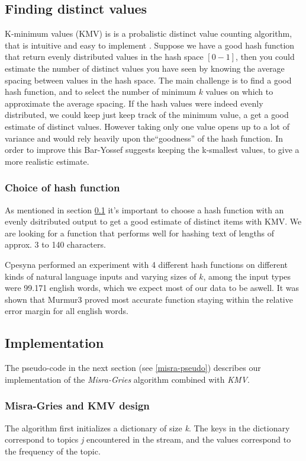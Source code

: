 

\subsection{Finding distinct values}\label{algo-distinct}
K-minimum values (KMV) is is a probalistic distinct value counting algorithm, that is intuitive and easy to implement \cite{kmv}. Suppose we have a good hash function that return evenly distributed values in the hash space $[0-1]$, then you could estimate the number of distinct values you have seen by knowing the average spacing between values in the hash space. The main challenge is to find a good hash function, and to select the number of minimum $k$ values on which to approximate the average spacing. If the hash values were indeed evenly distributed, we could keep just keep track of the minimum value, a get a good estimate of distinct values. However taking only one value opens up to a lot of variance and would rely heavily upon the``goodness'' of the hash function. In order to improve this Bar-Yossef\cite{Bar-Yossef} suggests keeping the k-smallest values, to give a more realistic estimate.

\subsubsection{Choice of hash function}\label{hash-function}
As mentioned in section \ref{algo-distinct} it's important to choose a hash function with an evenly dsitributed output to get a good estimate of distinct items with KMV. We are looking for a function that performs well for hashing text of lengths of approx. 3 to 140 characters. 

Cpesyna \cite{KMV1} performed an experiment with 4 different hash functions on different kinds of natural language inputs and varying sizes of $k$, among the input types were 99.171 english words, which we expect most of our data to be aswell. It was shown that Murmur3 proved most accurate function staying within the relative error margin for all english words.

\subsection{Implementation}\label{algo-data}
The pseudo-code in the next section (see \ref{misra-pseudo}) describes our implementation of the \textit{Misra-Gries} algorithm combined with \textit{KMV}.  

\subsubsection{Misra-Gries and KMV design}\label{misra-gries}
The algorithm first initializes a dictionary of size \textit{k}. The keys in the dictionary correspond to topics \textit{j} encountered in the stream, and the values correspond to the frequency  of the topic. 

